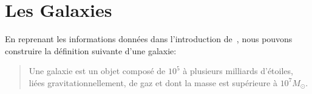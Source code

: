 



	\section{Les Galaxies}%
		En reprenant les informations données dans l'introduction de~\cite{binntre},
		nous pouvons construire la définition suivante d'une galaxie:
		\begin{quote}
			Une galaxie est un objet composé de $10^5$ à plusieurs milliards d'étoiles, liées gravitationnellement, de gaz et dont la masse
			est supérieure à $10^7M_\odot$.
		\end{quote}

